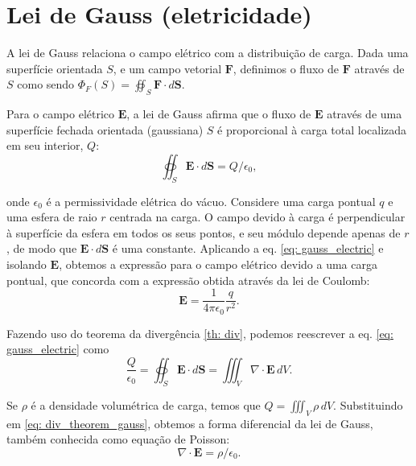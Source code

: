 \section{Lei de Gauss (eletricidade)}

A lei de Gauss relaciona o campo elétrico com a distribuição de carga. Dada uma superfície orientada $S$, e um campo vetorial $\mathbf F$, definimos o fluxo de $\mathbf{F}$ através de $S$ como sendo $\Phi_F(S) = \oiint_S \mathbf{F} \cdot d\mathbf{S}$.

Para o campo elétrico $\mathbf{E}$, a lei de Gauss afirma que o fluxo de $\mathbf{E}$ através de uma superfície fechada orientada (gaussiana) $S$ é proporcional à carga total localizada em seu interior, $Q$:
\begin{equation}
\oiint_{S} \mathbf{E} \cdot d\mathbf{S} = Q / \epsilon_0 ,
\label{eq: gauss_electric}
\end{equation} 

\noindent onde $\epsilon_0$ é a permissividade elétrica do vácuo. Considere uma carga pontual $q$ e uma esfera de raio $r$ centrada na carga. O campo devido à carga é perpendicular à superfície da esfera em todos os seus pontos, e seu módulo depende apenas de $r$, de modo que $\mathbf{E} \cdot d\mathbf{S}$ é uma constante. Aplicando a eq. \eqref{eq: gauss_electric} e isolando $\mathbf{E}$, obtemos a expressão para o campo elétrico devido a uma carga pontual, que concorda com a expressão obtida através da lei de Coulomb:
\begin{equation}
\mathbf{E} = \frac{1}{4\pi \epsilon_0} \frac{q}{r^2}.
\label{eq: coulomb} 
\end{equation}

Fazendo uso do teorema da divergência \eqref{th: div}, podemos reescrever a eq. \eqref{eq: gauss_electric} como
\begin{equation}
\frac{Q}{\epsilon_0}
= \oiint_S \mathbf{E} \cdot d\mathbf{S}
= \iiint_V \nabla \cdot \mathbf{E} \,dV.
\label{eq: div_theorem_gauss}
\end{equation}

\noindent Se $\rho$ é a densidade volumétrica de carga, temos que $Q = \iiint_V \rho \,dV$. Substituindo em \eqref{eq: div_theorem_gauss}, obtemos a forma diferencial da lei de Gauss, também conhecida como equação de Poisson:
\begin{equation}
\nabla \cdot \mathbf{E} = \rho / \epsilon_0.
\label{eq: poisson}
\end{equation}

